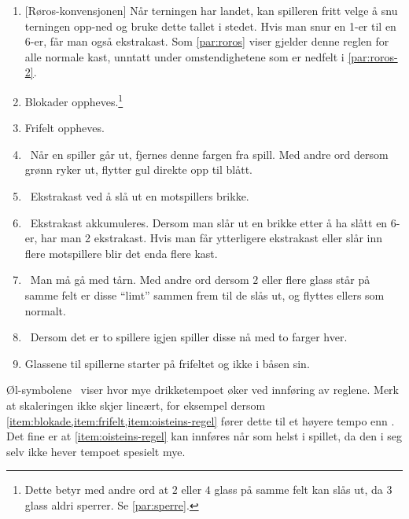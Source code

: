 \documentclass[10pt,a4paper,norsk,openany]{book}
\begin{document}
\begin{enumerate}
  \item\phantom{.}[Røros-konvensjonen] Når terningen har landet, kan
    spilleren fritt velge å snu terningen opp-ned og bruke dette tallet i
    stedet. Hvis man snur en 1-er til en 6-er, får man også ekstrakast. Som
    \cref{par:roros} viser gjelder denne reglen for alle normale kast, unntatt
    under omstendighetene som er nedfelt i \cref{par:roros-2}.

  \item \faBeer \label{item:blokade} Blokader oppheves.\footnote{Dette betyr med
    andre ord at $2$ eller $4$ glass på samme felt kan slås ut, da $3$ glass
    aldri sperrer. Se \cref{par:sperre}.}

  \item \faBeer \label{item:frifelt} Frifelt oppheves.

  \item \faBeer \ Når en spiller går ut, fjernes denne fargen fra spill. Med
    andre ord dersom grønn ryker ut, flytter gul direkte opp til blått. 

  \item \faBeer \faBeer \ Ekstrakast ved å slå ut en motspillers brikke.

  \item \faBeer \faBeer \ Ekstrakast akkumuleres. Dersom man slår ut en brikke
    etter å ha slått en 6-er, har man 2 ekstrakast. Hvis man får ytterligere
    ekstrakast eller slår inn flere motspillere blir det enda flere kast.

  \item \faBeer \faBeer \ Man må gå med tårn. Med andre ord dersom $2$ eller
    flere glass står på samme felt er disse ``limt'' sammen frem til de slås ut,
    og flyttes ellers som normalt. 

  \item \faBeer \faBeer \faBeer \ Dersom det er to spillere igjen spiller disse
    nå med to farger hver.

  \item \faBeer \faBeer \label{item:oisteins-regel} Glassene til spillerne
    starter på frifeltet og ikke i båsen sin.
\end{enumerate}

Øl-symbolene \faBeer\ viser hvor mye drikketempoet øker ved innføring av reglene.
Merk at skaleringen ikke skjer lineært, for eksempel dersom
\cref{item:blokade,item:frifelt,item:oisteins-regel} fører dette til et høyere tempo
enn \faBeer\faBeer\faBeer\faBeer. Det fine er at \cref{item:oisteins-regel} kan
innføres når som helst i spillet, da den i seg selv ikke hever tempoet spesielt mye.
\end{document}
